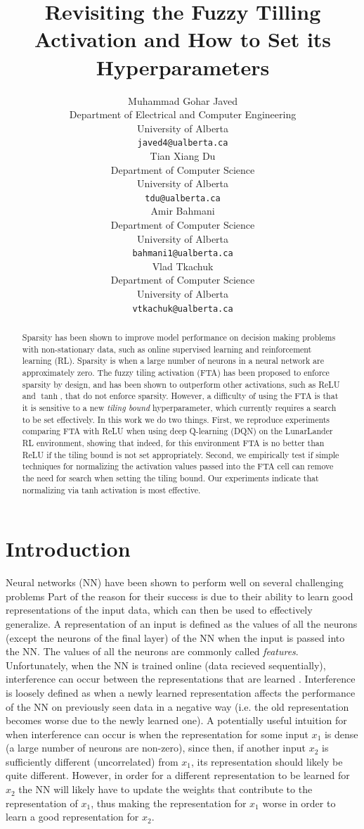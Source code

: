 \documentclass{article}
\title{Revisiting the Fuzzy Tilling Activation and How to Set its Hyperparameters}
\author{%
  Muhammad Gohar Javed \\
  Department of Electrical and Computer Engineering \\
  University of Alberta\\
  \texttt{javed4@ualberta.ca} \\
  \And
  Tian Xiang Du \\
  Department of Computer Science\\
  University of Alberta\\
  \texttt{tdu@ualberta.ca} \\
  \AND
  Amir Bahmani \\
  Department of Computer Science\\
  University of Alberta\\
  \texttt{bahmani1@ualberta.ca} \\
  \And
  Vlad Tkachuk \\
  Department of Computer Science\\
  University of Alberta\\
  \texttt{vtkachuk@ualberta.ca} \\
}
\begin{document}
\maketitle


\begin{abstract}
  Sparsity has been shown to improve model performance on decision making problems with non-stationary data, such as online supervised learning and reinforcement learning (RL).
  Sparsity is when a large number of neurons in a neural network are approximately zero.
  The fuzzy tiling activation (FTA) has been proposed to enforce sparsity by design, and has been shown to outperform other activations, such as ReLU and $\tanh$, that do not enforce sparsity.
  However, a difficulty of using the FTA is that it is sensitive to a new \textit{tiling bound} hyperparameter, which currently requires a search to be set effectively.
  In this work we do two things. 
  First, we reproduce experiments comparing FTA with ReLU when using deep Q-learning (DQN) on the LunarLander RL environment, showing that indeed, for this environment FTA is no better than ReLU if the tiling bound is not set appropriately.
  Second, we empirically test if simple techniques for normalizing the activation values passed into the FTA cell can remove the need for search when setting the tiling bound.
  Our experiments indicate that normalizing via tanh activation is most effective.


\end{abstract}


\section{Introduction} \label{sec:intro}
Neural networks (NN) have been shown to perform well on several challenging problems \cite{brown2020language,krizhevsky2017imagenet,mnih2013playing,silver2017mastering} 
Part of the reason for their success is due to their ability to learn good representations of the input data, which can then be used to effectively generalize.
A representation of an input is defined as the values of all the neurons (except the neurons of the final layer) of the NN when the input is passed into the NN.
The values of all the neurons are commonly called \textit{features}.  
Unfortunately, when the NN is trained online (data recieved sequentially), interference can occur between the representations that are learned \cite[]{chandak2019learning,caselles2018continual,madjiheurem2019representation}.
Interference is loosely defined as when a newly learned representation affects the performance of the NN on previously seen data in a negative way (i.e. the old representation becomes worse due to the newly learned one).
A potentially useful intuition for when interference can occur is when the representation for some input $x_1$ is dense (a large number of neurons are non-zero), 
since then, if another input $x_2$ is sufficiently different (uncorrelated) from $x_1$, its representation should likely be quite different.
However, in order for a different representation to be learned for $x_2$ the NN will likely have to update the weights that contribute to the representation of $x_1$, 
thus making the representation for $x_1$ worse in order to learn a good representation for $x_2$.
\end{document}
